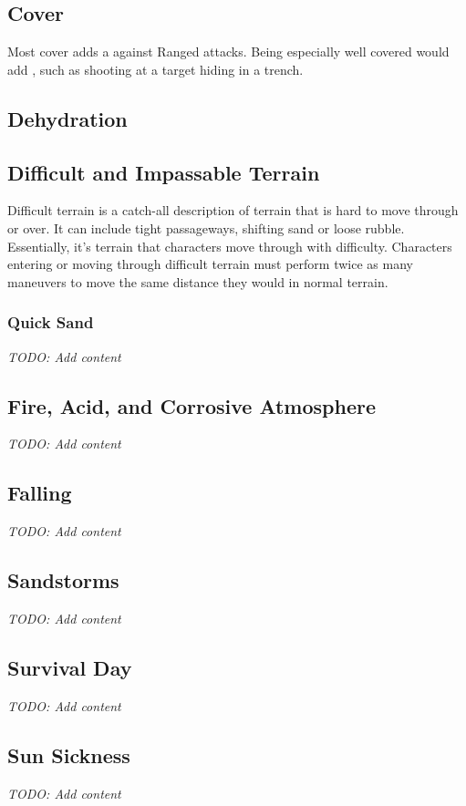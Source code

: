 \subsection{Cover}
Most cover adds a \setback against Ranged attacks. Being especially well covered
would add \setback\setback, such as shooting at a target hiding in a trench.

\subsection{Dehydration}
\subsection{Difficult and Impassable Terrain}
Difficult terrain is a catch-all description of terrain that is hard to move through
or over. It can include tight passageways, shifting sand or loose rubble. Essentially,
it's terrain that characters move through with difficulty. Characters entering or
moving through difficult terrain must perform twice as many maneuvers to move the
same distance they would in normal terrain.

\subsubsection{Quick Sand}

\textit{TODO: Add content}

\subsection{Fire, Acid, and Corrosive Atmosphere}
\textit{TODO: Add content}
\subsection{Falling}
\textit{TODO: Add content}
\subsection{Sandstorms}
\textit{TODO: Add content}
\subsection{Survival Day}
\textit{TODO: Add content}
\subsection{Sun Sickness}
\textit{TODO: Add content}

